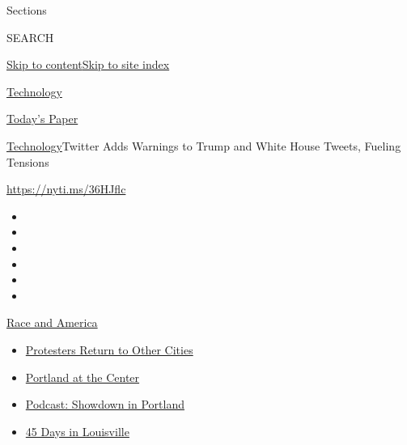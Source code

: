Sections

SEARCH

\protect\hyperlink{site-content}{Skip to
content}\protect\hyperlink{site-index}{Skip to site index}

\href{https://www.nytimes3xbfgragh.onion/section/technology}{Technology}

\href{https://myaccount.nytimes3xbfgragh.onion/auth/login?response_type=cookie\&client_id=vi}{}

\href{https://www.nytimes3xbfgragh.onion/section/todayspaper}{Today's
Paper}

\href{/section/technology}{Technology}\textbar{}Twitter Adds Warnings to
Trump and White House Tweets, Fueling Tensions

\url{https://nyti.ms/36HJflc}

\begin{itemize}
\item
\item
\item
\item
\item
\item
\end{itemize}

\href{https://www.nytimes3xbfgragh.onion/news-event/george-floyd-protests-minneapolis-new-york-los-angeles?action=click\&pgtype=Article\&state=default\&region=TOP_BANNER\&context=storylines_menu}{Race
and America}

\begin{itemize}
\tightlist
\item
  \href{https://www.nytimes3xbfgragh.onion/2020/07/26/us/protests-portland-seattle-trump.html?action=click\&pgtype=Article\&state=default\&region=TOP_BANNER\&context=storylines_menu}{Protesters
  Return to Other Cities}
\item
  \href{https://www.nytimes3xbfgragh.onion/2020/07/24/us/portland-oregon-protests-white-race.html?action=click\&pgtype=Article\&state=default\&region=TOP_BANNER\&context=storylines_menu}{Portland
  at the Center}
\item
  \href{https://www.nytimes3xbfgragh.onion/2020/07/23/podcasts/the-daily/portland-protests.html?action=click\&pgtype=Article\&state=default\&region=TOP_BANNER\&context=storylines_menu}{Podcast:
  Showdown in Portland}
\item
  \href{https://www.nytimes3xbfgragh.onion/interactive/2020/07/16/us/black-lives-matter-protests-louisville-breonna-taylor.html?action=click\&pgtype=Article\&state=default\&region=TOP_BANNER\&context=storylines_menu}{45
  Days in Louisville}
\end{itemize}

